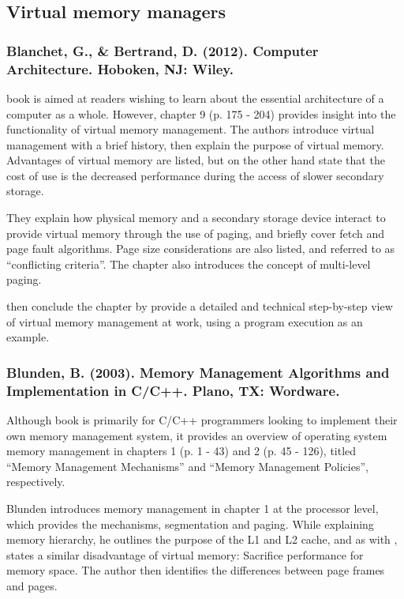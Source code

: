 \subsection{Virtual memory managers}

\subsubsection*{Blanchet, G., \& Bertrand, D. (2012). Computer Architecture. Hoboken, NJ: Wiley.}

 book is aimed at readers wishing to learn about the essential architecture of a computer as a whole. However, chapter 9 (p. 175 - 204) provides insight into the functionality of virtual memory management. The authors introduce virtual management with a brief history, then explain the purpose of virtual memory. Advantages of virtual memory are listed, but on the other hand state that the cost of use is the decreased performance during the access of slower secondary storage.

They explain how physical memory and a secondary storage device interact to provide virtual memory through the use of paging, and briefly cover fetch and page fault algorithms. Page size considerations are also listed, and referred to as ``conflicting criteria''. The chapter also introduces the concept of multi-level paging.

\citet{Blanchet2012} then conclude the chapter by provide a detailed and technical step-by-step view of virtual memory management at work, using a program execution as an example.

\subsubsection*{Blunden, B. (2003). Memory Management Algorithms and Implementation in C/C++. Plano, TX: Wordware.}

Although  book is primarily for C/C++ programmers looking to implement their own memory management system, it provides an overview of operating system memory management in chapters 1 (p. 1 - 43) and 2 (p. 45 - 126), titled ``Memory Management Mechanisms'' and ``Memory Management Policies'', respectively.

Blunden introduces memory management in chapter 1 at the processor level, which provides the mechanisms, segmentation and paging. While explaining memory hierarchy, he outlines the purpose of the L1 and L2 cache, and as with \citet{Blanchet2012}, states a similar disadvantage of virtual memory: Sacrifice performance for memory space. The author then identifies the differences between page frames and pages.

